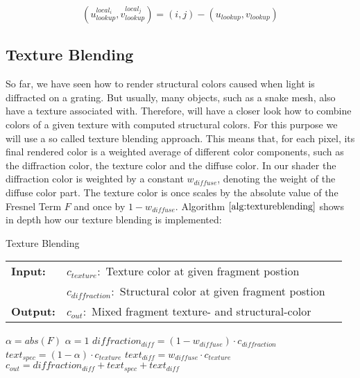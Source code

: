 \begin{equation}
  (u_{lookup}^{local_i}, v_{lookup}^{local_j}) = (i,j)-(u_{lookup}, v_{lookup})
\label{eq:gaussianwindowlook}
\end{equation}

\subsection{Texture Blending}
So far, we have seen how to render structural colors caused when light is diffracted on a grating. But usually, many objects, such as a snake mesh, also have a texture associated with. Therefore, will have a closer look how to combine colors of a given texture with computed structural colors. For this purpose we will use a so called texture blending approach. This means that, for each pixel, its final rendered color is a weighted average of different color components, such as the diffraction color, the texture color and the diffuse color. In our shader the diffraction color is weighted by a constant $w_{diffuse}$, denoting the weight of the diffuse color part. The texture color is once scales by the absolute value of the Fresnel Term $F$ and once by $1-w_{diffuse}$. Algorithm $\ref{alg:textureblending}$ shows in depth how our texture blending is implemented:

\begin{algorithm}[H]
\caption{Texture Blending}
\begin{table}[H]
  \begin{tabular}{@{}lll@{}}
    \textbf{Input:} & $c_{texture}:$ Texture color at given fragment postion \\
    & $c_{diffraction}:$ Structural color at given fragment postion \\
    \textbf{Output:} & $c_{out}:$ Mixed fragment texture- and structural-color \\
  \end{tabular} 
\end{table}
\setlength{\fboxrule}{0pt} 
\begin{boxedminipage}{1.0\textwidth}
  \begin{algorithmic}[1]
    \State $\alpha = abs(F)$
     \State $\alpha = 1$ \EndIf
    \State $diffraction_{diff} = (1-w_{diffuse}) \cdot c_{diffraction}$
    \State $text_{spec} = (1-\alpha) \cdot c_{texture}$
    \State $text_{diff} = w_{diffuse} \cdot c_{texture}$
    \State $c_{out} = diffraction_{diff} + text_{spec} + text_{diff}$
  \end{algorithmic}
  \end{boxedminipage}
  \vskip1.5pt
\label{alg:textureblending}
\end{algorithm}

